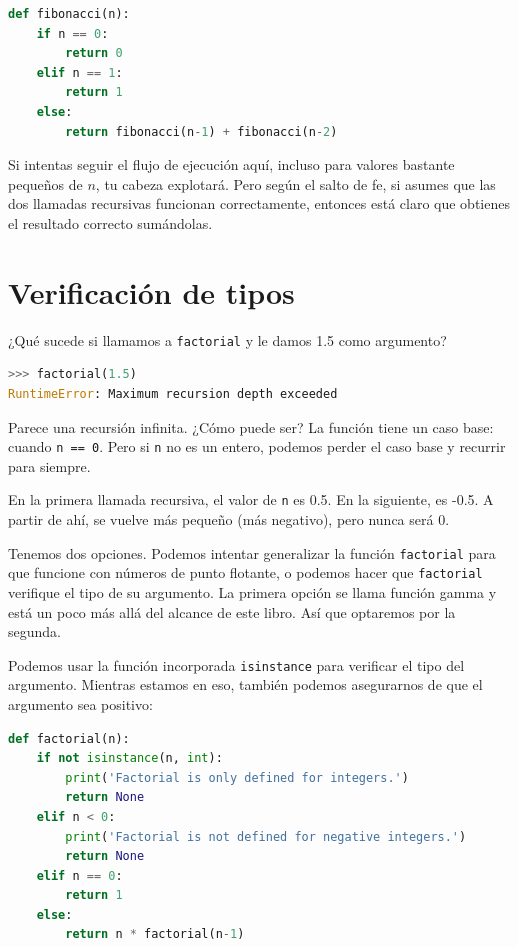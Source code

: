 \begin{lstlisting}[language=Python]
def fibonacci(n):
    if n == 0:
        return 0
    elif n == 1:
        return 1
    else:
        return fibonacci(n-1) + fibonacci(n-2)
\end{lstlisting}

Si intentas seguir el flujo de ejecución aquí, incluso para valores bastante pequeños de $n$, tu cabeza explotará. Pero según el salto de fe, si asumes que las dos llamadas recursivas funcionan correctamente, entonces está claro que obtienes el resultado correcto sumándolas.

\section{Verificación de tipos}

¿Qué sucede si llamamos a \texttt{factorial} y le damos 1.5 como argumento?

\begin{lstlisting}[language=Python]
>>> factorial(1.5)
RuntimeError: Maximum recursion depth exceeded
\end{lstlisting}

Parece una recursión infinita. ¿Cómo puede ser? La función tiene un caso base: cuando \texttt{n == 0}. Pero si \texttt{n} no es un entero, podemos perder el caso base y recurrir para siempre.

En la primera llamada recursiva, el valor de \texttt{n} es 0.5. En la siguiente, es -0.5. A partir de ahí, se vuelve más pequeño (más negativo), pero nunca será 0.

Tenemos dos opciones. Podemos intentar generalizar la función \texttt{factorial} para que funcione con números de punto flotante, o podemos hacer que \texttt{factorial} verifique el tipo de su argumento. La primera opción se llama función gamma y está un poco más allá del alcance de este libro. Así que optaremos por la segunda.

Podemos usar la función incorporada \texttt{isinstance} para verificar el tipo del argumento. Mientras estamos en eso, también podemos asegurarnos de que el argumento sea positivo:

\begin{lstlisting}[language=Python]
def factorial(n):
    if not isinstance(n, int):
        print('Factorial is only defined for integers.')
        return None
    elif n < 0:
        print('Factorial is not defined for negative integers.')
        return None
    elif n == 0:
        return 1
    else:
        return n * factorial(n-1)
\end{lstlisting}

